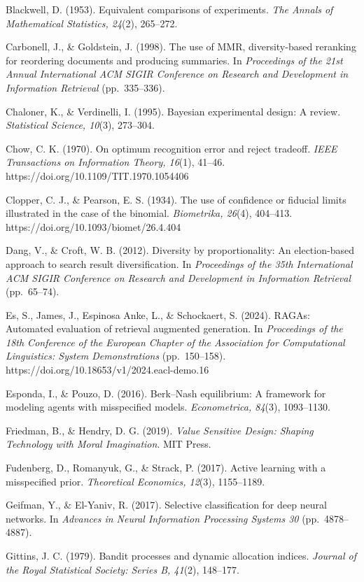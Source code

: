 \documentclass[
  11pt]{article}
\begin{document}
Blackwell, D. (1953). Equivalent comparisons of experiments. \emph{The
Annals of Mathematical Statistics, 24}(2), 265--272.

Carbonell, J., \& Goldstein, J. (1998). The use of MMR, diversity-based
reranking for reordering documents and producing summaries. In
\emph{Proceedings of the 21st Annual International ACM SIGIR Conference
on Research and Development in Information Retrieval} (pp.~335--336).

Chaloner, K., \& Verdinelli, I. (1995). Bayesian experimental design: A
review. \emph{Statistical Science, 10}(3), 273--304.

Chow, C. K. (1970). On optimum recognition error and reject tradeoff.
\emph{IEEE Transactions on Information Theory, 16}(1), 41--46.
https://doi.org/10.1109/TIT.1970.1054406

Clopper, C. J., \& Pearson, E. S. (1934). The use of confidence or
fiducial limits illustrated in the case of the binomial.
\emph{Biometrika, 26}(4), 404--413.
https://doi.org/10.1093/biomet/26.4.404

Dang, V., \& Croft, W. B. (2012). Diversity by proportionality: An
election-based approach to search result diversification. In
\emph{Proceedings of the 35th International ACM SIGIR Conference on
Research and Development in Information Retrieval} (pp.~65--74).

Es, S., James, J., Espinosa Anke, L., \& Schockaert, S. (2024). RAGAs:
Automated evaluation of retrieval augmented generation. In
\emph{Proceedings of the 18th Conference of the European Chapter of the
Association for Computational Linguistics: System Demonstrations}
(pp.~150--158). https://doi.org/10.18653/v1/2024.eacl-demo.16

Esponda, I., \& Pouzo, D. (2016). Berk--Nash equilibrium: A framework
for modeling agents with misspecified models. \emph{Econometrica,
84}(3), 1093--1130.

Friedman, B., \& Hendry, D. G. (2019). \emph{Value Sensitive Design:
Shaping Technology with Moral Imagination}. MIT Press.

Fudenberg, D., Romanyuk, G., \& Strack, P. (2017). Active learning with
a misspecified prior. \emph{Theoretical Economics, 12}(3), 1155--1189.

Geifman, Y., \& El-Yaniv, R. (2017). Selective classification for deep
neural networks. In \emph{Advances in Neural Information Processing
Systems 30} (pp.~4878--4887).

Gittins, J. C. (1979). Bandit processes and dynamic allocation indices.
\emph{Journal of the Royal Statistical Society: Series B, 41}(2),
148--177.
\end{document}
